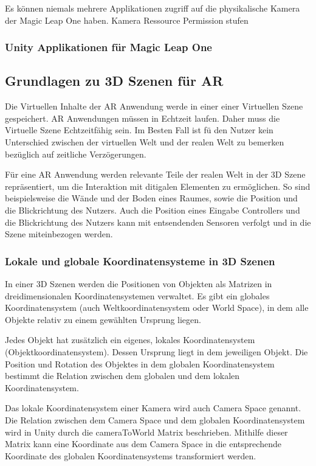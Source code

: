 Es können niemals mehrere Applikationen zugriff auf die physikalische Kamera der Magic Leap One haben. Kamera Ressource
Permission stufen


\subsubsection{Unity Applikationen für Magic Leap One}


\subsection{Grundlagen zu 3D Szenen für AR}


Die Virtuellen Inhalte der AR Anwendung werde in einer einer Virtuellen Szene gespeichert. 
AR Anwendungen müssen in Echtzeit laufen. Daher muss die Virtuelle Szene Echtzeitfähig sein.
Im Besten Fall ist fü den Nutzer kein Unterschied zwischen der virtuellen Welt und der realen Welt zu bemerken bezüglich auf zeitliche Verzögerungen.

Für eine AR Anwendung werden relevante Teile der realen Welt in der 3D Szene repräsentiert, um die Interaktion mit ditigalen Elementen zu ermöglichen.
So sind beispielsweise die Wände und der Boden eines Raumes, sowie die Position und die Blickrichtung des Nutzers. Auch die Position eines Eingabe Controllers und die Blickrichtung des Nutzers kann mit entsendenden Sensoren verfolgt und in die Szene miteinbezogen werden.

\subsubsection{Lokale und globale Koordinatensysteme in 3D Szenen}
In einer 3D Szenen werden die Positionen von Objekten als Matrizen in dreidimensionalen Koordinatensystemen verwaltet.
Es gibt ein globales Koordinatensystem (auch Weltkoordinatensystem oder World Space), in dem alle Objekte relativ zu einem gewählten Ursprung liegen. 

Jedes Objekt hat zusätzlich ein eigenes, lokales Koordinatensystem (Objektkoordinatensystem). Dessen Ursprung liegt in dem jeweiligen Objekt.
Die Position und Rotation des Objektes in dem globalen Koordinatensystem bestimmt die Relation zwischen dem globalen und dem lokalen Koordinatensystem. 

Das lokale Koordinatensystem einer Kamera wird auch Camera Space genannt. Die Relation zwischen dem Camera Space und dem globalen Koordinatensystem wird in Unity durch die cameraToWorld Matrix beschrieben. Mithilfe dieser Matrix kann eine Koordinate aus dem Camera Space in die entsprechende Koordinate des globalen Koordinatensystems transformiert werden.\citep{unitycameratoworldmatrix}

